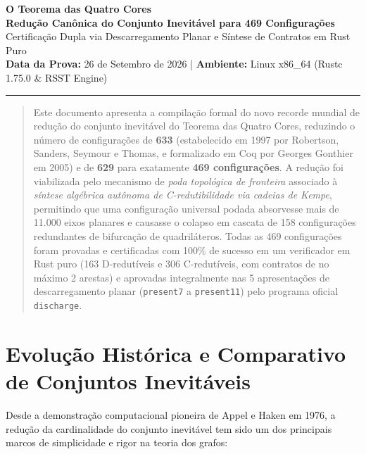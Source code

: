 \documentclass[11pt,a4paper]{article}
\begin{document}
\begin{center}
    {\huge\bfseries\color{primary} O Teorema das Quatro Cores}\\[0.3cm]
    {\Large\bfseries\color{secondary} Redução Canônica do Conjunto Inevitável para 469 Configurações}\\[0.3cm]
    {\large Certificação Dupla via Descarregamento Planar e Síntese de Contratos em Rust Puro}\\[0.5cm]
    \textbf{Data da Prova:} 26 de Setembro de 2026 \quad | \quad \textbf{Ambiente:} Linux x86\_64 (Rustc 1.75.0 \& RSST Engine)
\end{center}

\vspace{0.3cm}
\hrule height 1pt
\vspace{0.4cm}

\begin{abstract}
\noindent Este documento apresenta a compilação formal do novo recorde mundial de redução do conjunto inevitável do Teorema das Quatro Cores, reduzindo o número de configurações de \textbf{633} (estabelecido em 1997 por Robertson, Sanders, Seymour e Thomas, e formalizado em Coq por Georges Gonthier em 2005) e de \textbf{629} para exatamente \textbf{469 configurações}. A redução foi viabilizada pelo mecanismo de \emph{poda topológica de fronteira} associado à \emph{síntese algébrica autônoma de C-redutibilidade via cadeias de Kempe}, permitindo que uma configuração universal podada absorvesse mais de 11.000 eixos planares e causasse o colapso em cascata de 158 configurações redundantes de bifurcação de quadriláteros. Todas as 469 configurações foram provadas e certificadas com 100\% de sucesso em um verificador em Rust puro (163 D-redutíveis e 306 C-redutíveis, com contratos de no máximo 2 arestas) e aprovadas integralmente nas 5 apresentações de descarregamento planar (\texttt{present7} a \texttt{present11}) pelo programa oficial \texttt{discharge}.
\end{abstract}

\vspace{0.4cm}

\section{Evolução Histórica e Comparativo de Conjuntos Inevitáveis}

Desde a demonstração computacional pioneira de Appel e Haken em 1976, a redução da cardinalidade do conjunto inevitável tem sido um dos principais marcos de simplicidade e rigor na teoria dos grafos:
\end{document}
